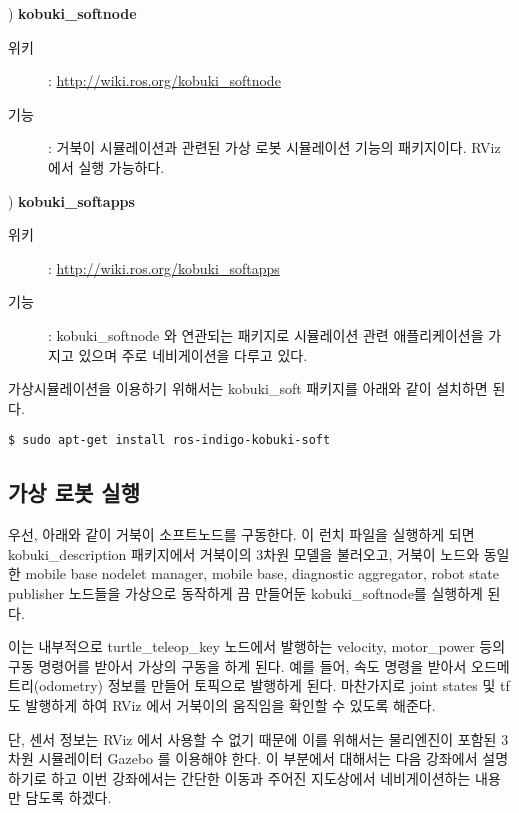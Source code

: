\setcounter{num}{0}

\vspace{\baselineskip}
\noindent{}
\thenum) \textbf{kobuki\_softnode}
\begin{description}
\item[위키]: \url{http://wiki.ros.org/kobuki_softnode}
\item[기능]: 거북이 시뮬레이션과 관련된 가상 로봇 시뮬레이션 기능의 패키지이다. RViz 에서 실행 가능하다.
\end{description}

\vspace{\baselineskip}
\noindent{}
\thenum) \textbf{kobuki\_softapps}
\begin{description}
\item[위키]: \url{http://wiki.ros.org/kobuki_softapps}
\item[기능]: kobuki\_softnode 와 연관되는 패키지로 시뮬레이션 관련 애플리케이션을 가지고 있으며 주로 네비게이션을 다루고 있다.
\end{description}

가상시뮬레이션을 이용하기 위해서는 kobuki\_soft 패키지를 아래와 같이 설치하면 된다.

\vspace{\baselineskip}
\begin{lstlisting}[language=ROS]
$ sudo apt-get install ros-indigo-kobuki-soft
\end{lstlisting}

\subsection{가상 로봇 실행}

우선, 아래와 같이 거북이 소프트노드를 구동한다. 이 런치 파일을 실행하게 되면 kobuki\_description 패키지에서 거북이의 3차원 모델을 불러오고, 거북이 노드와 동일한 mobile base nodelet manager, mobile base, diagnostic aggregator, robot state publisher 노드들을 가상으로 동작하게 끔 만들어둔 kobuki\_softnode를 실행하게 된다.

이는 내부적으로 turtle\_teleop\_key 노드에서 발행하는 velocity, motor\_power 등의 구동 명령어를 받아서 가상의 구동을 하게 된다. 예를 들어, 속도 명령을 받아서 오드메트리(odometry) 정보를 만들어 토픽으로 발행하게 된다. 마찬가지로 joint states 및 tf 도 발행하게 하여 RViz 에서 거북이의 움직임을 확인할 수 있도록 해준다.

단, 센서 정보는 RViz 에서 사용할 수 없기 때문에 이를 위해서는 물리엔진이 포함된 3차원 시뮬레이터 Gazebo 를 이용해야 한다.  이 부분에서 대해서는 다음 강좌에서 설명하기로 하고 이번 강좌에서는 간단한 이동과 주어진 지도상에서 네비게이션하는 내용만 담도록 하겠다.
 
